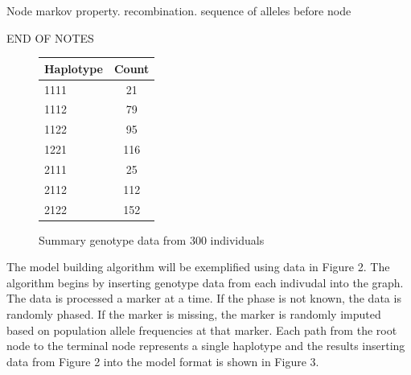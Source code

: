 \documentclass[a4paper,12pt,twoside,abstraction,titlepage]{article}
\begin{document}
Node markov property. recombination. sequence of alleles before node 


END OF NOTES

\begin{figure}[htp]
\centering
\begin{tabular}{lc}
\toprule
Haplotype & Count \\
\midrule
1111 & 21\\ 
1112 &  79\\
1122 & 95\\
1221 & 116 \\
2111 & 25\\
2112 & 112\\
2122 & 152\\
\bottomrule 
\end{tabular}
\vspace{5pt}
\caption{Summary genotype data from 300 individuals}

\vspace{-5pt}
\end{figure}


The model building algorithm will be exemplified using data in Figure 2.   The algorithm begins by inserting genotype data from each indivudal into the graph.  The data is processed a marker at a time.  If the phase is not known, the data is randomly phased.  If the marker is missing, the marker is randomly imputed based on population allele frequencies at that marker.  Each path from the root node to the terminal node represents a single haplotype and the results inserting data from Figure 2 into the model format is shown in Figure 3.
\end{document}
